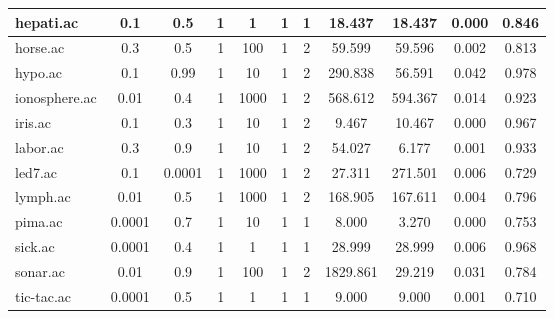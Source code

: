\begin{table}[htbp]
\begin{tabular}{|l|c|c|c|c|c|c|c|c|c|c|}
		\hline
		hepati.ac      & 0.1      & 0.5         & 1              & 1                   & 1             & 1             & 18.437         & 18.437         & 0.000          & 0.846          \\
		\hline
		horse.ac       & 0.3      & 0.5         & 1              & 100                 & 1             & 2             & 59.599         & 59.596         & 0.002          & 0.813          \\
		\hline
		hypo.ac        & 0.1      & 0.99        & 1              & 10                  & 1             & 2             & 290.838        & 56.591         & 0.042          & 0.978          \\
		\hline
		ionosphere.ac  & 0.01     & 0.4         & 1              & 1000                & 1             & 2             & 568.612        & 594.367        & 0.014          & 0.923          \\
		\hline
		iris.ac        & 0.1      & 0.3         & 1              & 10                  & 1             & 2             & 9.467          & 10.467         & 0.000          & 0.967          \\
		\hline
		labor.ac       & 0.3      & 0.9         & 1              & 10                  & 1             & 2             & 54.027         & 6.177          & 0.001          & 0.933          \\
		\hline
		led7.ac        & 0.1      & 0.0001      & 1              & 1000                & 1             & 2             & 27.311         & 271.501        & 0.006          & 0.729          \\
		\hline
		lymph.ac       & 0.01     & 0.5         & 1              & 1000                & 1             & 2             & 168.905        & 167.611        & 0.004          & 0.796          \\
		\hline
		pima.ac        & 0.0001   & 0.7         & 1              & 10                  & 1             & 1             & 8.000          & 3.270          & 0.000          & 0.753          \\
		\hline
		sick.ac        & 0.0001   & 0.4         & 1              & 1                   & 1             & 1             & 28.999         & 28.999         & 0.006          & 0.968          \\
		\hline
		sonar.ac       & 0.01     & 0.9         & 1              & 100                 & 1             & 2             & 1829.861       & 29.219         & 0.031          & 0.784          \\
		\hline
		tic-tac.ac     & 0.0001   & 0.5         & 1              & 1                   & 1             & 1             & 9.000          & 9.000          & 0.001          & 0.710          \\

\end{tabular}
\end{table}
